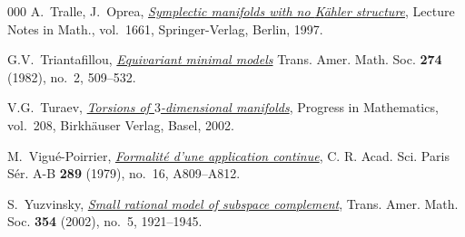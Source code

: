 \documentclass{article}
\numberwithin{equation}{section}
\theoremstyle{definition}
\begin{document}
\begin{thebibliography}{000}
 A.~Tralle, J.~Oprea, 
\href{https://dx.doi.org/10.1007/BFb0092608}%
{\em Symplectic manifolds with no {K}\"{a}hler structure}, 
Lecture Notes in Math., vol.~1661, Springer-Verlag, Berlin, 1997. 

 G.V.~Triantafillou, 
\href{https://dx.doi.org/10.2307/1999119}%
{\em Equivariant minimal models}
Trans. Amer. Math. Soc. \textbf{274} (1982), no.~2, 509--532. 

 V.G.~Turaev, 
\href{https://dx.doi.org/10.1007/978-3-0348-7999-6}%
{\em Torsions of $3$-dimensional manifolds}, 
Progress in Mathematics, vol.~208, Birkh\"{a}user 
Verlag, Basel, 2002. 

 M.~Vigu\'{e}-Poirrier,
\href{https://gallica.bnf.fr/ark:/12148/bpt6k54905784/f49.item.zoom}%
{\em Formalité d'une application continue}, 
C. R. Acad. Sci. Paris S\'er. A-B \textbf{289} 
(1979), no.~16, A809--A812. 

 S.~Yuzvinsky, 
\href{https://dx.doi.org/10.1090/S0002-9947-02-02924-0}%
{\em  Small rational model of subspace complement}, Trans. 
Amer. Math. Soc.  \textbf{354} (2002), no.~5, 1921--1945.

\end{thebibliography}
\end{document}
